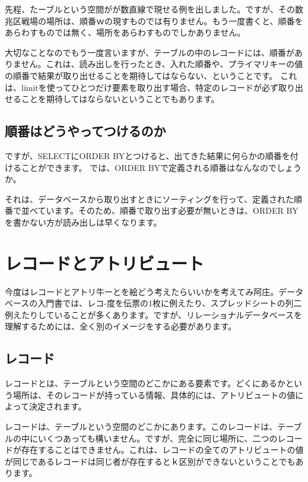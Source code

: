 先程、たーブルという空間がが数直線で現せる例を出しました。ですが、その数兆区戦場の場所は、順番ｗの現すものでは有りません。もう一度書くと、順番をあらわすものでは無く、場所をあらわすものでしかありません。

大切なことなのでもう一度言いますが、テーブルの中のレコードには、順番がありません。これは、読み出しを行ったとき、入れた順番や、プライマリキーの値の順番で結果が取り出せることを期待してはならない、ということです。
これは、limitを使ってひとつだけ要素を取り出す場合、特定のレコードが必ず取り出せることを期待してはならないということでもあります。

\subsection{順番はどうやってつけるのか}

ですが、SELECTにORDER BYとつけると、出てきた結果に何らかの順番を付けることができます。
では、ORDER BYで定義される順番はなんなのでしょうか。

それは、データベースから取り出すときにソーティングを行って、定義された順番で並べています。そのため、順番で取り出す必要が無いときは、ORDER BYを書かない方が読み出しは早くなります。



\section{レコードとアトリビュート}

今度はレコードとアトリ牛ーとを絵どう考えたらいいかを考えてみ阿庄。データベースの入門書では、レコ-度を伝票の1枚に例えたり、スプレッドシートの列二例えたりしていることが多くあります。ですが、リレーショナルデータベースを理解するためには、全く別のイメージをする必要があります。

\subsection{レコード}

レコードとは、テーブルという空間のどこかにある要素です。どくにあるかという場所は、そのレコードが持っている情報、具体的には、アトリビュートの値によって決定されます。

レコードは、テーブルという空間のどこかにあります。このレコードは、テーブルの中にいくつあっても構いません。ですが、完全に同じ場所に、二つのレコードが存在することはできません。これは、レコードの全てのアトリビュートの値が同じであるレコードは同じ者が存在するとｋ区別ができないということでもあります。

